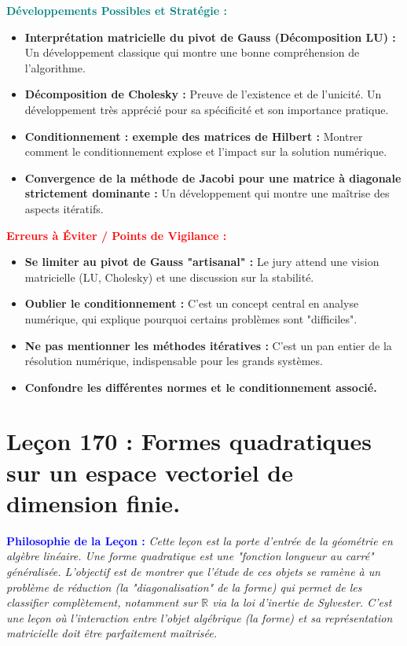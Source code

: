 \documentclass[12pt, a4paper, parskip=full]{report}
\theoremstyle{agregstyle}
\newenvironment{philosophie}
  {\par\medskip\noindent\begin{oframed}\noindent\textbf{\textcolor{blue}{Philosophie de la Leçon :}}\itshape}
  {\end{oframed}\par\medskip}
\newenvironment{developpements}
  {\par\medskip\noindent\begin{oframed}\noindent\textbf{\textcolor{teal}{Développements Possibles et Stratégie :}}}
  {\end{oframed}\par\medskip}
\newenvironment{erreurs}
  {\par\medskip\noindent\begin{oframed}\noindent\textbf{\textcolor{red}{Erreurs à Éviter / Points de Vigilance :}}}
  {\end{oframed}\par\medskip}
\begin{document}
\begin{developpements}
    \begin{itemize}
        \item \textbf{Interprétation matricielle du pivot de Gauss (Décomposition LU) :} Un développement classique qui montre une bonne compréhension de l'algorithme.
        \item \textbf{Décomposition de Cholesky :} Preuve de l'existence et de l'unicité. Un développement très apprécié pour sa spécificité et son importance pratique.
        \item \textbf{Conditionnement : exemple des matrices de Hilbert :} Montrer comment le conditionnement explose et l'impact sur la solution numérique.
        \item \textbf{Convergence de la méthode de Jacobi pour une matrice à diagonale strictement dominante :} Un développement qui montre une maîtrise des aspects itératifs.
    \end{itemize}
\end{developpements}

\begin{erreurs}
    \begin{itemize}
        \item \textbf{Se limiter au pivot de Gauss "artisanal" :} Le jury attend une vision matricielle (LU, Cholesky) et une discussion sur la stabilité.
        \item \textbf{Oublier le conditionnement :} C'est un concept central en analyse numérique, qui explique pourquoi certains problèmes sont "difficiles".
        \item \textbf{Ne pas mentionner les méthodes itératives :} C'est un pan entier de la résolution numérique, indispensable pour les grands systèmes.
        \item \textbf{Confondre les différentes normes et le conditionnement associé.}
    \end{itemize}
\end{erreurs}
\chapter{Leçon 170 : Formes quadratiques sur un espace vectoriel de dimension finie.}

\begin{philosophie}
    Cette leçon est la porte d'entrée de la géométrie en algèbre linéaire. Une forme quadratique est une "fonction longueur au carré" généralisée. L'objectif est de montrer que l'étude de ces objets se ramène à un problème de réduction (la "diagonalisation" de la forme) qui permet de les classifier complètement, notamment sur $\mathbb{R}$ via la loi d'inertie de Sylvester. C'est une leçon où l'interaction entre l'objet algébrique (la forme) et sa représentation matricielle doit être parfaitement maîtrisée.
\end{philosophie}
\end{document}
